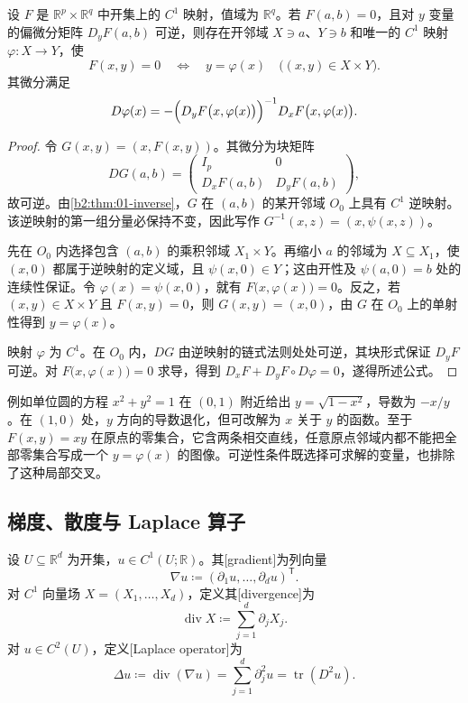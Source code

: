 \begin{theorem}[隐函数]\label{b2:thm:01-implicit}
设 \(F\) 是 \(\mathbb R^p\times\mathbb R^q\) 中开集上的 \(C^1\) 映射，值域为 \(\mathbb R^q\)。若 \(F(a,b)=0\)，且对 \(y\) 变量的偏微分矩阵 \(D_yF(a,b)\) 可逆，则存在开邻域 \(X\ni a\)、\(Y\ni b\) 和唯一的 \(C^1\) 映射 \(\varphi:X\rightarrow Y\)，使
\[
 F(x,y)=0\quad\Longleftrightarrow\quad y=\varphi(x)
 \quad\bigl((x,y)\in X\times Y\bigr).
\]
其微分满足
\[
 D\varphi(x)=-\Bigl(D_yF\bigl(x,\varphi(x)\bigr)\Bigr)^{-1}
 D_xF\bigl(x,\varphi(x)\bigr).
\]
\end{theorem}
\begin{proof}
令 \(G(x,y)=(x,F(x,y))\)。其微分为块矩阵
\[
 DG(a,b)=
 \begin{pmatrix}I_p&0\\D_xF(a,b)&D_yF(a,b)\end{pmatrix},
\]
故可逆。由\cref{b2:thm:01-inverse}，\(G\) 在 \((a,b)\) 的某开邻域 \(O_0\) 上具有 \(C^1\) 逆映射。该逆映射的第一组分量必保持不变，因此写作 \(G^{-1}(x,z)=(x,\psi(x,z))\)。

先在 \(O_0\) 内选择包含 \((a,b)\) 的乘积邻域 \(X_1\times Y\)。再缩小 \(a\) 的邻域为 \(X\subseteq X_1\)，使 \((x,0)\) 都属于逆映射的定义域，且 \(\psi(x,0)\in Y\)；这由开性及 \(\psi(a,0)=b\) 处的连续性保证。令 \(\varphi(x)=\psi(x,0)\)，就有 \(F\bigl(x,\varphi(x)\bigr)=0\)。反之，若 \((x,y)\in X\times Y\) 且 \(F(x,y)=0\)，则 \(G(x,y)=(x,0)\)，由 \(G\) 在 \(O_0\) 上的单射性得到 \(y=\varphi(x)\)。

映射 \(\varphi\) 为 \(C^1\)。在 \(O_0\) 内，\(DG\) 由逆映射的链式法则处处可逆，其块形式保证 \(D_yF\) 可逆。对 \(F\bigl(x,\varphi(x)\bigr)=0\) 求导，得到 \(D_xF+D_yF\circ D\varphi=0\)，遂得所述公式。
\end{proof}

例如单位圆的方程 \(x^2+y^2=1\) 在 \((0,1)\) 附近给出 \(y=\sqrt{1-x^2}\)，导数为 \(-x/y\)。在 \((1,0)\) 处，\(y\) 方向的导数退化，但可改解为 \(x\) 关于 \(y\) 的函数。至于 \(F(x,y)=xy\) 在原点的零集合，它含两条相交直线，任意原点邻域内都不能把全部零集合写成一个 \(y=\varphi(x)\) 的图像。可逆性条件既选择可求解的变量，也排除了这种局部交叉。

\subsection{梯度、散度与 Laplace 算子}
\label{b2:subsec:010104}

\begin{definition}\label{b2:def:01-vector-operators}
设 \(U\subseteq\mathbb R^d\) 为开集，\(u\in C^1(U;\mathbb R)\)。其[gradient]为列向量
\[
 \nabla u\coloneqq(\partial_1u,\ldots,\partial_du)^{\mathsf T}.
\]
对 \(C^1\) 向量场 \(X=(X_1,\ldots,X_d)\)，定义其[divergence]为
\[
 \operatorname{div}X\coloneqq\sum_{j=1}^d\partial_jX_j.
\]
对 \(u\in C^2(U)\)，定义[Laplace operator]为
\[
 \Delta u\coloneqq\operatorname{div}(\nabla u)
 =\sum_{j=1}^d\partial_j^2u=\operatorname{tr}(D^2u).
\]
\end{definition}

